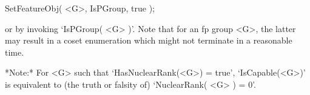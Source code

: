 SetFeatureObj( <G>, IsPGroup, true );

or by invoking `IsPGroup( <G> )'.  Note that for an fp group <G>, the
latter may result in a coset enumeration which might not
terminate in a reasonable time.

*Note:* For <G> such that `HasNuclearRank(<G>) = true',  `IsCapable(<G>)'
is equivalent to (the truth or falsity of) `NuclearRank( <G> ) = 0'.

